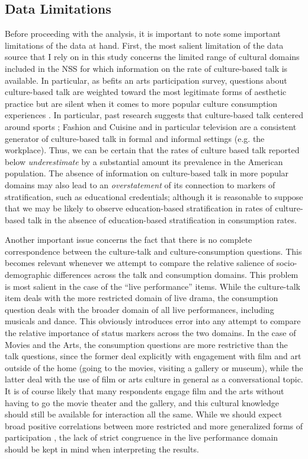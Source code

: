 \documentclass[11pt]{article}
\begin{document}
\subsection{Data Limitations}
Before proceeding with the analysis, it is important to note some important limitations of the data at hand.  First, the most salient limitation of the data source that I rely on in this study concerns the limited range of cultural domains included in the NSS for which information on the rate of culture-based talk is available.  In particular, as befits an arts participation survey, questions about culture-based talk are weighted toward the most legitimate forms of aesthetic practice but are silent when it comes to more popular culture consumption experiences \citep{dimaggio_mukhtar04}. In particular, past research suggests that culture-based talk centered around sports \citep{erickson96}; Fashion and Cuisine \citep{dimaggio87} and in particular television \citep{fiske87} are a consistent generator of culture-based talk in formal  and informal settings (e.g. the workplace).  Thus, we can be certain that the rates of culture based talk reported below \emph{underestimate} by a substantial amount its prevalence in the American population.   The absence of information on culture-based talk in more popular domains may also lead to an \emph{overstatement} of its connection to markers of stratification, such as educational credentials; although it is reasonable to suppose that we may be likely to observe education-based stratification in rates of culture-based talk in the absence of education-based stratification in consumption rates.  

Another important issue concerns the fact that there is no complete correspondence between the culture-talk and culture-consumption questions.  This becomes relevant whenever we attempt to compare the relative salience of socio-demographic differences across the talk and consumption domains.  This problem is most salient in the case of the ``live performance'' items.  While the culture-talk item deals with the more restricted domain of live drama, the consumption question deals with the broader domain of all live performances, including musicals and dance.  This obviously introduces error into any attempt to compare the relative importance of status markers across the two domains.  In the case of Movies and the Arts, the consumption questions are more restrictive than the talk questions, since the former deal explicitly with engagement with film and art outside of the home (going to the movies, visiting a gallery or museum), while the latter deal with the use of film or arts culture in general as a conversational topic.  It is of course likely that many respondents engage film and the arts without having to go the movie theater and the gallery, and this cultural knowledge should still be available for interaction all the same.  While we should expect broad positive correlations between more restricted and more generalized forms of participation \citep{dimaggio_useem78a, sullivan_katzgerro07}, the lack of strict congruence in the live performance domain should be kept in mind when interpreting the results. 
\end{document}
